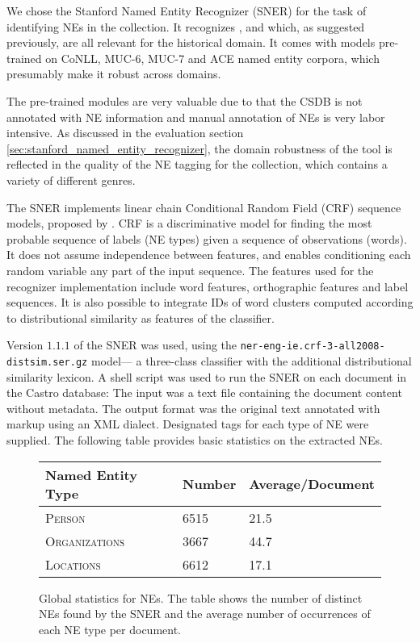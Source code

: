 We chose the Stanford Named Entity Recognizer (SNER) \cite{sner} for the task of identifying NEs in the collection. It recognizes ,  and  which, as suggested previously, are all relevant for the historical domain. It comes with models pre-trained on CoNLL, MUC-6, MUC-7 and ACE named entity corpora, which presumably make it robust across domains.

The pre-trained modules are very valuable due to that the CSDB is not annotated with NE information and manual annotation of NEs is very labor intensive. As discussed in the evaluation section \ref{sec:stanford_named_entity_recognizer}, the domain robustness of the tool is reflected in the quality of the NE tagging for the collection, which contains a variety of different genres. 

The SNER implements linear chain Conditional Random Field (CRF) sequence models, proposed by \cite{lafferty2001conditional}.
CRF is a discriminative model for finding the most probable sequence of labels (NE types) given a sequence of observations (words). 
It does not assume independence between features, and enables conditioning each random variable any part of the input sequence. The features used for the recognizer implementation include word features, orthographic features and label sequences. It is also possible to integrate IDs of word clusters computed according to distributional similarity as features of the classifier.

Version $1.1.1$ of the SNER was used, using the
\texttt{ner-eng-ie.crf-3-all2008-distsim.ser.gz} model--- a three-class classifier with the additional
distributional similarity lexicon. A shell script was used to run the SNER on each document in the Castro database: The input was a text file containing the document content without metadata. The output format was the original text annotated with markup using an XML dialect. Designated tags for each type of NE were supplied. The following table provides basic statistics on the extracted NEs.

\begin{figure}[ht]
\centering
\caption{Global statistics for NEs. The table shows the number of distinct NEs found by the SNER and the average number of occurrences of each NE type per document.}
\begin{tabular}{l|ll}
  Named Entity Type      & Number & Average/Document\\
  \hline
  \textsc{Person}        & 6515   & 21.5\\
  \textsc{Organizations} & 3667   & 44.7\\
  \textsc{Locations}     & 6612   & 17.1\\
\end{tabular}
\label{fig:ne_statistics}
\end{figure}